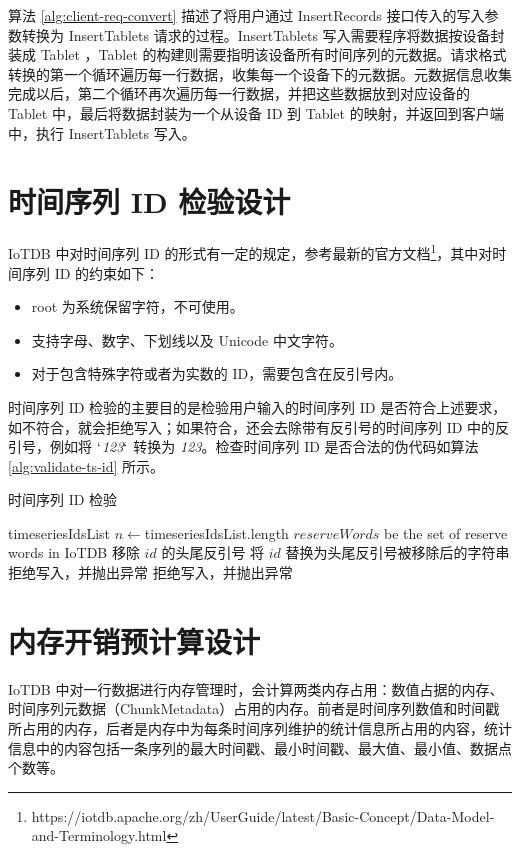 算法 \ref{alg:client-req-convert} 描述了将用户通过  InsertRecords 接口传入的写入参数转换为 InsertTablets 请求的过程。InsertTablets 写入需要程序将数据按设备封装成 Tablet ，Tablet 的构建则需要指明该设备所有时间序列的元数据。请求格式转换的第一个循环遍历每一行数据，收集每一个设备下的元数据。元数据信息收集完成以后，第二个循环再次遍历每一行数据，并把这些数据放到对应设备的 Tablet 中，最后将数据封装为一个从设备 ID 到 Tablet 的映射，并返回到客户端中，执行 InsertTablets 写入。

\section{时间序列 ID 检验设计}
IoTDB 中对时间序列 ID 的形式有一定的规定，参考最新的官方文档\footnote{https://iotdb.apache.org/zh/UserGuide/latest/Basic-Concept/Data-Model-and-Terminology.html}，其中对时间序列 ID 的约束如下：
\begin{itemize}
  \item root 为系统保留字符，不可使用。
  \item 支持字母、数字、下划线以及 Unicode 中文字符。
  \item 对于包含特殊字符或者为实数的 ID，需要包含在反引号内。
\end{itemize}
时间序列 ID 检验的主要目的是检验用户输入的时间序列 ID 是否符合上述要求，如不符合，就会拒绝写入；如果符合，还会去除带有反引号的时间序列 ID 中的反引号，例如将 $`$\emph{123}$`$ 转换为 \emph{123}。检查时间序列 ID 是否合法的伪代码如算法 \ref{alg:validate-ts-id} 所示。
\begin{algorithm}
  \caption{时间序列 ID 检验}
  \label{alg:validate-ts-id}
  \small
  \begin{algorithmic}
    \REQUIRE timeseriesIdsList
    \STATE  $n \leftarrow $timeseriesIdsList.length
    \STATE $reserveWords$ be the set of reserve words in IoTDB
      \STATE 移除 $id$ 的头尾反引号
      \STATE 将 $id$ 替换为头尾反引号被移除后的字符串
      \ELSE
      \STATE 拒绝写入，并抛出异常
      \ENDIF
    \STATE 拒绝写入，并抛出异常
    \ENDIF
    \ENDFOR
    \ENDFOR
  \end{algorithmic}
\end{algorithm}

\section{内存开销预计算设计}
IoTDB 中对一行数据进行内存管理时，会计算两类内存占用：数值占据的内存、时间序列元数据（ChunkMetadata）占用的内存。前者是时间序列数值和时间戳所占用的内存，后者是内存中为每条时间序列维护的统计信息所占用的内容，统计信息中的内容包括一条序列的最大时间戳、最小时间戳、最大值、最小值、数据点个数等。

